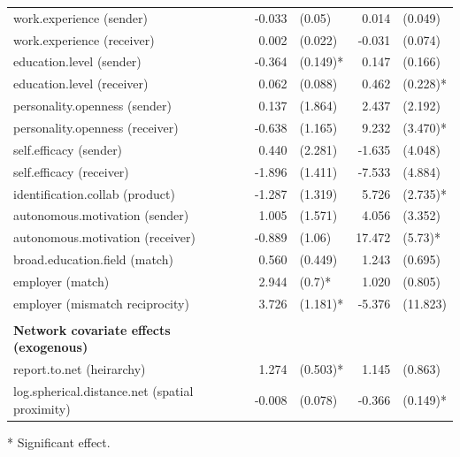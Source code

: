 \begin{table}[]
\begin{threeparttable}
\begin{tabular}{@{}lrlrl@{}}
			work.experience (sender)                        & -0.033    & (0.05)      & 0.014    & (0.049)   \\
			work.experience (receiver)                      & 0.002     & (0.022)     & -0.031   & (0.074)   \\
			education.level (sender)                        & -0.364    & (0.149)*    & 0.147    & (0.166)   \\
			education.level (receiver)                      & 0.062     & (0.088)     & 0.462    & (0.228)*  \\
			personality.openness (sender)                   & 0.137     & (1.864)     & 2.437    & (2.192)   \\
			personality.openness (receiver)                 & -0.638    & (1.165)     & 9.232    & (3.470)*   \\
			self.efficacy (sender)                          & 0.440     & (2.281)     & -1.635   & (4.048)   \\
			self.efficacy (receiver)                        & -1.896    & (1.411)     & -7.533   & (4.884)   \\
			identification.collab (product)                 & -1.287    & (1.319)     & 5.726    & (2.735)*  \\
			autonomous.motivation (sender)                  & 1.005     & (1.571)     & 4.056    & (3.352)   \\
			autonomous.motivation (receiver)                & -0.889    & (1.06)      & 17.472   & (5.73)*   \\
			broad.education.field (match)                   & 0.560     & (0.449)     & 1.243    & (0.695)   \\
			employer (match)                                & 2.944     & (0.7)*      & 1.020    & (0.805)   \\
			employer (mismatch reciprocity)                 & 3.726     & (1.181)*    & -5.376   & (11.823)  \\
															&           &             &          &           \\
			\textbf{Network covariate effects (exogenous)}  &           &             &          &           \\
			report.to.net (heirarchy)                       & 1.274     & (0.503)*    & 1.145    & (0.863)   \\
			log.spherical.distance.net (spatial proximity)  & -0.008    & (0.078)     & -0.366   & (0.149)*  \\ \bottomrule
		\end{tabular}
		\begin{tablenotes}
			\small
			\item [*] Significant effect.
		\end{tablenotes}
	\end{threeparttable}
\end{table}



